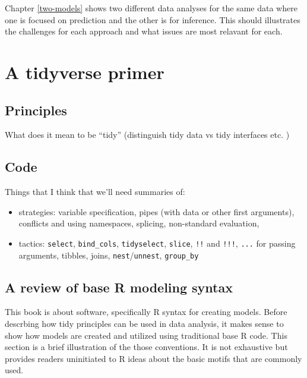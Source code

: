 \documentclass[11pt]{book}
\begin{document}
Chapter \ref{two-models} shows two different data analyses for the same data where one is focused on prediction and the other is for inference. This should illustrates the challenges for each approach and what issues are most relavant for each.

\hypertarget{tidyverse-primer}{%
\chapter{A tidyverse primer}\label{tidyverse-primer}}

\hypertarget{principles}{%
\section{Principles}\label{principles}}

What does it mean to be ``tidy'' (distinguish tidy data vs tidy interfaces etc. )

\hypertarget{code}{%
\section{Code}\label{code}}

Things that I think that we'll need summaries of:

\begin{itemize}
\item
  strategies: variable specification, pipes (with data or other first arguments), conflicts and using namespaces, splicing, non-standard evaluation,
\item
  tactics: \texttt{select}, \texttt{bind\_cols}, \texttt{tidyselect}, \texttt{slice}, \texttt{!!} and \texttt{!!!}, \texttt{...} for passing arguments, tibbles, joins, \texttt{nest}/\texttt{unnest}, \texttt{group\_by}
\end{itemize}

\hypertarget{r-review}{%
\section{A review of base R modeling syntax}\label{r-review}}

This book is about software, specifically R syntax for creating models. Before descrbing how tidy principles can be used in data analysis, it makes sense to show how models are created and utilized using traditional base R code. This section is a brief illustration of the those conventions. It is not exhaustive but provides readers uninitiated to R ideas about the basic motifs that are commonly used.
\end{document}
